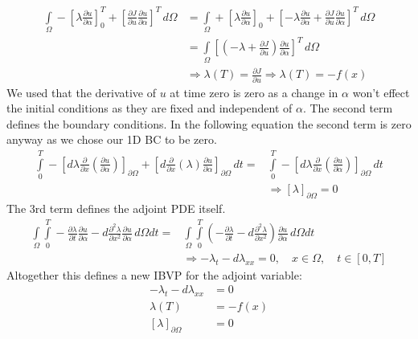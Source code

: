 \begin{align}
\int\limits_{\Omega} -\left[ \lambda \frac{\partial u}{\partial \alpha} \right]_{0}^{T} 
+ \left[ \frac{\partial J}{\partial u} \frac{\partial u}{\partial \alpha}\right]^T \,d\Omega &=
\int\limits_{\Omega} +\left[ \lambda \frac{\partial u}{\partial \alpha} \right]_{0} + \left[- \lambda \frac{\partial u}{\partial \alpha} + \frac{\partial J}{\partial u} \frac{\partial u}{\partial \alpha} \right]^{T} \,d\Omega \\
&= \int\limits_{\Omega} \left[\left(- \lambda + \frac{\partial J}{\partial u} \right) \frac{\partial u}{\partial \alpha} \right]^{T} \,d\Omega \\
&\Rightarrow \lambda(T) = \frac{\partial J}{\partial u} \Rightarrow \lambda(T) = -f(x)
\end{align}
We used that the derivative of $u$ at time zero is zero as a change in $\alpha$ won't effect the initial conditions as they are fixed and independent of $\alpha$. The second term defines the boundary conditions. In the following equation the second term is zero anyway as we chose our 1D BC to be zero. 
\begin{align}
\int\limits_{0}^{T} -\left[ d \lambda \frac{\partial}{\partial x}\left( \frac{\partial u}{\partial \alpha} \right) \right]_{\partial\Omega} 
+ \left[ d \frac{\partial}{\partial x} \left( \lambda\right) \frac{\partial u}{\partial \alpha} \right]_{\partial\Omega} \,dt = &
\int\limits_{0}^{T} -\left[ d \lambda \frac{\partial}{\partial x}\left( \frac{\partial u}{\partial \alpha} \right) \right]_{\partial\Omega} \,dt  \\
& \Rightarrow \left[ \lambda \right]_{\partial\Omega} = 0
\end{align}
The 3rd term defines the adjoint PDE itself.
\begin{align}
\int\limits_{\Omega}\int\limits_{0}^{T} - \frac{\partial \lambda}{\partial t} \frac{\partial u}{\partial \alpha} - d \frac{\partial^2 \lambda}{\partial x^2}  \frac{\partial u}{\partial \alpha} \,d\Omega dt =&
\int\limits_{\Omega}\int\limits_{0}^{T} \left(- \frac{\partial \lambda}{\partial t}  - d \frac{\partial^2 \lambda}{\partial x^2} \right)  \frac{\partial u}{\partial \alpha} \,d\Omega dt \\
&\Rightarrow -\lambda_t - d\lambda_{xx} = 0,\quad x\in\Omega,\quad t\in[0,T]
\end{align}
Altogether this defines a new IBVP for the adjoint variable:
\begin{align}
-\lambda_t - d\lambda_{xx} &= 0 \\
\lambda(T) &= -f(x) \\
\left[\lambda\right]_{\partial\Omega} &= 0
\end{align}
